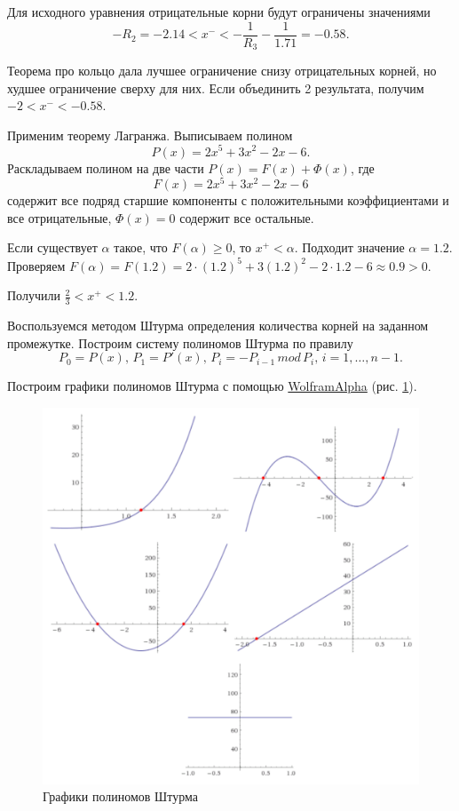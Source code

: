 Для исходного уравнения отрицательные корни будут ограничены значениями
$$- R_2 =
- 2.14 <
x^{-} <
- \frac{1}{R_3} 
- \frac{1}{1.71} =
- 0.58.$$

Теорема про кольцо дала лучшее ограничение снизу отрицательных корней, но худшее ограничение сверху для них.
Если объединить 2 результата, получим $- 2 < x^{-} < - 0.58$.

Применим теорему Лагранжа.
Выписываем полином
$$P \left( x \right) = 2x^5 + 3x^2 - 2x - 6.$$
Раскладываем полином на две части $P \left( x \right) = F \left( x \right) + \Phi \left( x \right) $,
где
$$F \left( x \right) = 2x^5 + 3x^2 - 2x - 6$$
содержит все подряд старшие компоненты с положительными коэффициентами и все отрицательные,
$ \Phi \left( x \right) = 0$ содержит все остальные.

Если существует $ \alpha $ такое, что $F \left( \alpha \right) \geq 0$, то $x^{+} < \alpha $.
Подходит значение $ \alpha = 1.2$.
Проверяем
$F \left( \alpha \right) =
F \left( 1.2 \right) =
2 \cdot \left( 1.2 \right)^5 + 3 \left( 1.2 \right)^2 - 2 \cdot 1.2 - 6 \approx 0.9 > 0$.

Получили $ \frac{2}{3} < x^{+} < 1.2$.

Воспользуемся методом Штурма определения количества корней на заданном промежутке.
Построим систему полиномов Штурма по правилу
$$P_0 = P \left( x \right), \,
P_1 = P' \left( x \right), \,
P_i = - P_{i - 1} \, mod \, P_i, \,
i = 1, \dotsc, n - 1.$$

\lstset{inputencoding=utf8, extendedchars=\true}


Построим графики полиномов Штурма с помощью \href{http://www.wolframalpha.com}{WolframAlpha} (рис. \ref{fig:storm}).

\begin{figure}[h!]
  \centering
  \includegraphics[width=.6\textwidth]{plot.png}
  \caption{Графики полиномов Штурма}
\label{fig:storm}
\end{figure}


